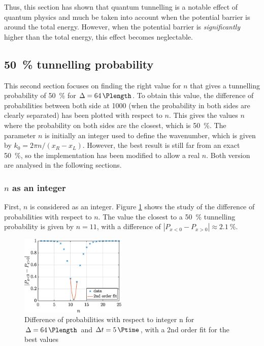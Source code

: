 \documentclass[a4paper,12pt,twoside]{article}
\newcommand{\abs}[1]{\left|#1\right|}
\begin{document}
    Thus, this section has shown that quantum tunnelling is a notable effect of quantum physics and much be taken into account when the potential barrier is around the total energy.
    However, when the potential barrier is \textit{significantly} higher than the total energy, this effect becomes neglectable.\\

  \subsection{\SI{50}{\percent} tunnelling probability}
    This second section focuses on finding the right value for $n$ that gives a tunnelling probability of \SI{50}{\percent} for $\Delta = \SI{64}{\Plength}$.
    To obtain this value, the difference of probabilities between both side at \SI{1000}{\Ptime} (when the probability in both sides are clearly separated) has been plotted with respect to $n$.
    This gives the values $n$ where the probability on both sides are the closest, which is \SI{50}{\percent}.
    The parameter $n$ is initially an integer used to define the wavenumber, which is given by $k_0 = 2\pi n/(x_R-x_L)$.
    However, the best result is still far from an exact \SI{50}{\percent}, so the implementation has been modified to allow a real $n$.
    Both version are analysed in the following sections.\\

    \subsubsection{$n$ as an integer}
      First, $n$ is considered as an integer.
      Figure \ref{fig:iii_findn_n} shows the study of the difference of probabilities with respect to $n$.
      The value the closest to a \SI{50}{\percent} tunnelling probability is given by $n = 11$, with a difference of $\abs{P_{x<0} - P_{x>0}} \approx \SI{2.1}{\percent}$.\\

      \begin{figure}[h]
        \centering
        \includegraphics[width=0.45\textwidth]{graphs/iii_findn_n_approx.eps}
        \caption{Difference of probabilities with respect to integer n for $\Delta = \SI{64}{\Plength}$ and $\Delta t = \SI{5}{\Ptime}$, with a 2nd order fit for the best values}
        \label{fig:iii_findn_n}
      \end{figure}
\end{document}
